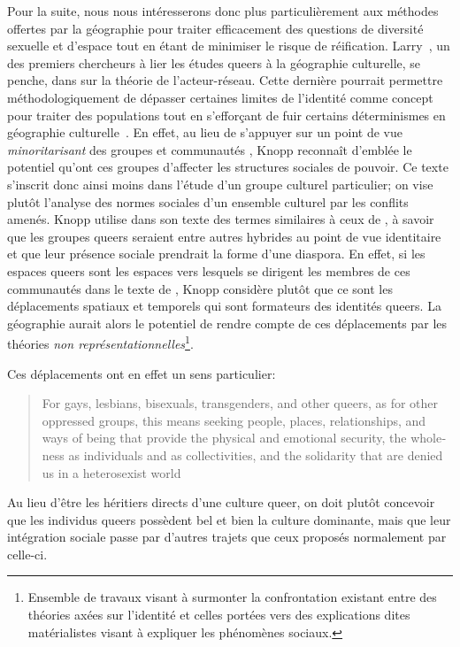 Pour la suite, nous nous intéresserons donc plus particulièrement aux méthodes offertes par la géographie pour traiter efficacement des questions de diversité sexuelle et d'espace tout en étant de minimiser le risque de réification.
Larry~\citet{Knopp2004}, un des premiers chercheurs à lier les études queers à la géographie culturelle, se penche, dans  sur la théorie de l'acteur-réseau.
Cette dernière pourrait permettre méthodologiquement de dépasser certaines limites de l'identité comme concept pour traiter des populations \lgbt{} tout en s’efforçant de fuir certains déterminismes en géographie culturelle~\citep{Knopp2004}.
En effet, au lieu de s'appuyer sur un point de vue \emph{minoritarisant} des groupes et communautés \lgbt{}, Knopp reconnaît d'emblée le potentiel qu'ont ces groupes d'affecter les structures sociales de pouvoir.
Ce texte s'inscrit donc ainsi moins dans l'étude d'un groupe culturel particulier; on vise plutôt l'analyse des normes sociales d'un ensemble culturel par les conflits amenés.
Knopp utilise dans son texte des termes similaires à ceux de \citet{Sinfield1996}, à savoir que les groupes queers seraient entre autres hybrides au point de vue identitaire et que leur présence sociale prendrait la forme d'une diaspora.
En effet, si les espaces queers sont les espaces vers lesquels se dirigent les membres de ces communautés dans le texte de \citet{Sinfield1996}, Knopp considère plutôt que ce sont les déplacements spatiaux et temporels qui sont formateurs des identités queers.
La géographie aurait alors le potentiel de rendre compte de ces déplacements par les théories \emph{non représentationnelles}\footnote{Ensemble de travaux visant à surmonter la confrontation existant entre des théories axées sur l'identité et celles portées vers des explications dites matérialistes visant à expliquer les phénomènes sociaux.}.

Ces déplacements ont en effet un sens particulier: \foreignblockquote{english}[{\cite[123]{Knopp2004}}][.]{For gays, lesbians, bisexuals, transgenders, and other queers, as for other oppressed groups, this means seeking people, places, relationships, and ways of being that provide the physical and emotional security, the wholeness as individuals and as collectivities, and the solidarity that are denied us in a heterosexist world}
Au lieu d'être les héritiers directs d'une culture queer, on doit plutôt concevoir que les individus queers possèdent bel et bien la culture dominante, mais que leur intégration sociale passe par d'autres trajets que ceux proposés normalement par celle-ci.

